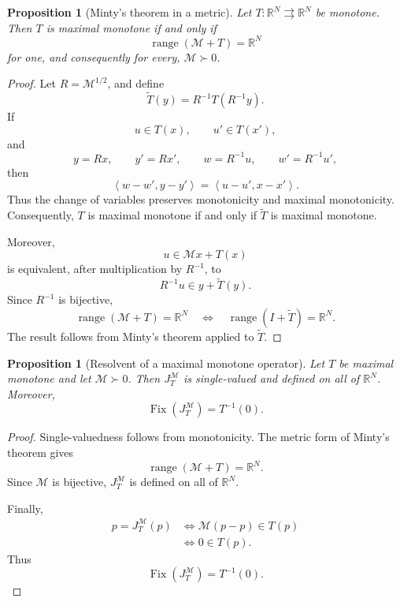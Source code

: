 \documentclass[a4paper,11pt]{book}
\theoremstyle{plain}
\newtheorem{proposition}[theorem]{Proposition}
\theoremstyle{definition}
\theoremstyle{remark}
\numberwithin{equation}{chapter}
\numberwithin{algorithm}{chapter}
\newcommand{\R}{\mathbb{R}}
\newcommand{\inner}[2]{\left\langle #1, #2 \right\rangle}
\newcommand{\range}{\operatorname{range}}
\DeclareMathOperator{\Fix}{Fix}
\begin{document}
	\begin{proposition}[Minty's theorem in a metric]
		Let \(T:\R^N\rightrightarrows\R^N\) be monotone. Then \(T\) is maximal
		monotone if and only if
		\[
		\range(\mathcal M+T)=\R^N
		\]
		for one, and consequently for every, \(\mathcal M\succ0\).
	\end{proposition}
	
	\begin{proof}
		Let \(R=\mathcal M^{1/2}\), and define
		\[
		\widetilde T(y)
		=
		R^{-1}T(R^{-1}y).
		\]
		If
		\[
		u\in T(x),
		\qquad
		u'\in T(x'),
		\]
		and
		\[
		y=Rx,
		\qquad
		y'=Rx',
		\qquad
		w=R^{-1}u,
		\qquad
		w'=R^{-1}u',
		\]
		then
		\[
		\inner{w-w'}{y-y'}
		=
		\inner{u-u'}{x-x'}.
		\]
		Thus the change of variables preserves monotonicity and maximal
		monotonicity. Consequently, \(T\) is maximal monotone if and only if
		\(\widetilde T\) is maximal monotone.
		
		Moreover,
		\[
		u\in\mathcal Mx+T(x)
		\]
		is equivalent, after multiplication by \(R^{-1}\), to
		\[
		R^{-1}u\in y+\widetilde T(y).
		\]
		Since \(R^{-1}\) is bijective,
		\[
		\range(\mathcal M+T)=\R^N
		\quad\Longleftrightarrow\quad
		\range(I+\widetilde T)=\R^N.
		\]
		The result follows from Minty's theorem applied to \(\widetilde T\).
	\end{proof}
	
	\begin{proposition}[Resolvent of a maximal monotone operator]
		Let \(T\) be maximal monotone and let \(\mathcal M\succ0\). Then
		\(J_T^{\mathcal M}\) is single-valued and defined on all of \(\R^N\).
		Moreover,
		\begin{equation}
			\Fix(J_T^{\mathcal M})=T^{-1}(0).
		\end{equation}
	\end{proposition}
	
	\begin{proof}
		Single-valuedness follows from monotonicity. The metric form of Minty's
		theorem gives
		\[
		\range(\mathcal M+T)=\R^N.
		\]
		Since \(\mathcal M\) is bijective, \(J_T^{\mathcal M}\) is defined on all
		of \(\R^N\).
		
		Finally,
		\begin{align}
			p=J_T^{\mathcal M}(p)
			&\iff
			\mathcal M(p-p)\in T(p)\\
			&\iff
			0\in T(p).
		\end{align}
		Thus
		\[
		\Fix(J_T^{\mathcal M})=T^{-1}(0).
		\]
	\end{proof}
	
\end{document}
